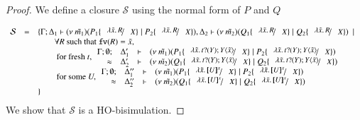 \begin{proof}
	\noi We define a closure $\mathcal{S}$ using the normal form of $P$ and $Q$

	\[
		\begin{array}{rcll}
			\mathcal{S} &=& \set{\horel{\Gamma}{\Delta_1}{\newsp{\tilde{m_1}}{P_1 \subst{\abs{\tilde{x}}{R}}{X} \Par P_2 \subst{\abs{\tilde{x}}{R}}{X}}}{,}{\Delta_2}{\newsp{\tilde{m_2}}{Q_1 \subst{\abs{\tilde{x}}{R}}{X} \Par Q_2 \subst{\abs{\tilde{x}}{R}}{X}}} \setbar \\
			&& \qquad \forall R \textrm{ such that } \fv{R} = \tilde{x},\\
			&& \qquad \textrm{ for fresh } t,
			\mhorel{\Gamma}{\Delta_1'}
			{\newsp{\tilde{m_1}}{P_1 \subst{\abs{\tilde{x}}{\binp{t}{Y} \appl{Y}{\tilde{x}}}}{X} \Par P_2 \subst{\abs{\tilde{x}}{\binp{t}{Y} \appl{Y}{\tilde{x}}}}{X}}}
			{\wb}
			{\Delta_2'}{}{\newsp{\tilde{m_2}}{Q_1 \subst{\abs{\tilde{x}}{\binp{t}{Y} \appl{Y}{\tilde{x}}}}{X} \Par Q_2 \subst{\abs{\tilde{x}}{\binp{t}{Y} \appl{Y}{\tilde{x}}}}{X}}}\\
			&& \qquad \textrm{ for some } U, 
			\mhorel{\Gamma}{\Delta_1''}
			{\newsp{\tilde{m_1}}{P_1 \subst{\abs{\tilde{x}}{\map{U}^x}}{X} \Par P_2 \subst{\abs{\tilde{x}}{\map{U}^x}}{X}}}
			{\wb}
			{\Delta_2''}{}{\newsp{\tilde{m_2}}{Q_1 \subst{\abs{\tilde{x}}{\map{U}^x}}{X} \Par Q_2 \subst{\abs{\tilde{x}}{\map{U}^x}}{X}}} \\
			&&}
		\end{array}
	\]
%
%
	\noi We show that $\mathcal{S}$ is a HO-bisimulation.


\end{proof}
